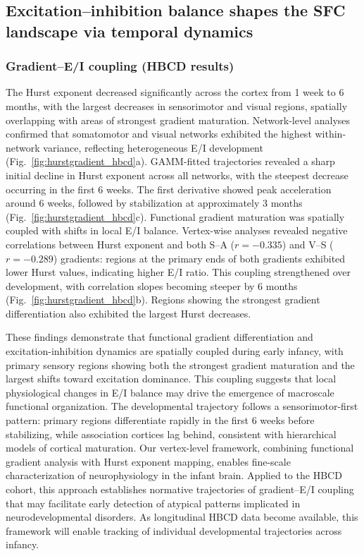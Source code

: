 \subsection{Excitation--inhibition balance shapes the SFC landscape via temporal dynamics}

\subsubsection{Gradient--E/I coupling (HBCD results)}
The Hurst exponent decreased significantly across the cortex from 1 week to 6 months, with the largest decreases in sensorimotor and visual regions, spatially overlapping with areas of strongest gradient maturation. Network-level analyses confirmed that somatomotor and visual networks exhibited the highest within-network variance, reflecting heterogeneous E/I development (Fig.~\ref{fig:hurstgradient_hbcd}a). GAMM-fitted trajectories revealed a sharp initial decline in Hurst exponent across all networks, with the steepest decrease occurring in the first 6 weeks. The first derivative showed peak acceleration around 6 weeks, followed by stabilization at approximately 3 months (Fig.~\ref{fig:hurstgradient_hbcd}c). Functional gradient maturation was spatially coupled with shifts in local E/I balance. Vertex-wise analyses revealed negative correlations between Hurst exponent and both S--A (\(r = -0.335\)) and V--S (\(r = -0.289\)) gradients: regions at the primary ends of both gradients exhibited lower Hurst values, indicating higher E/I ratio. This coupling strengthened over development, with correlation slopes becoming steeper by 6 months (Fig.~\ref{fig:hurstgradient_hbcd}b). Regions showing the strongest gradient differentiation also exhibited the largest Hurst decreases.

These findings demonstrate that functional gradient differentiation and excitation-inhibition dynamics are spatially coupled during early infancy, with primary sensory regions showing both the strongest gradient maturation and the largest shifts toward excitation dominance. This coupling suggests that local physiological changes in E/I balance may drive the emergence of macroscale functional organization. The developmental trajectory follows a sensorimotor-first pattern: primary regions differentiate rapidly in the first 6 weeks before stabilizing, while association cortices lag behind, consistent with hierarchical models of cortical maturation. Our vertex-level framework, combining functional gradient analysis with Hurst exponent mapping, enables fine-scale characterization of neurophysiology in the infant brain. Applied to the HBCD cohort, this approach establishes normative trajectories of gradient--E/I coupling that may facilitate early detection of atypical patterns implicated in neurodevelopmental disorders. As longitudinal HBCD data become available, this framework will enable tracking of individual developmental trajectories across infancy\cite{maoFunctionalGradientsExcitation2026}.

